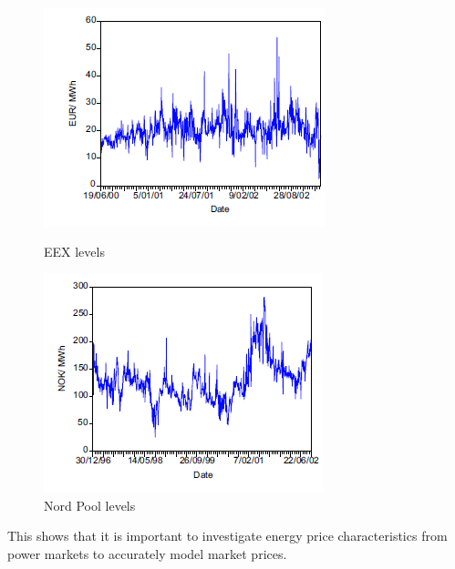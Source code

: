 \begin{figure}[!htbp]
  \centering
  \begin{minipage}[b]{0.4\textwidth}
    \includegraphics[width=\textwidth]{figures/state_of_the_art/EEX_levels.PNG}
    \caption{EEX levels \cite{mugele2005stable}}
		\label{fig:EEX_levels}
  \end{minipage}
  \hfill
  \begin{minipage}[b]{0.4\textwidth}
    \includegraphics[width=\textwidth]{figures/state_of_the_art/NordPool_levels.PNG}
    \caption{Nord Pool levels \cite{mugele2005stable}}
		\label{fig:NordPool_levels}
  \end{minipage}
\end{figure}

This shows that it is important to investigate energy price characteristics from power markets to accurately model market prices. 

